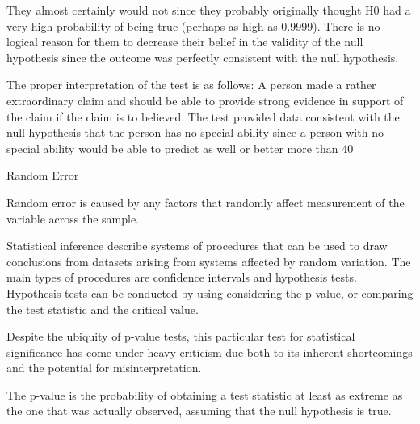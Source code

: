 They almost certainly would not since they probably originally thought H0 had a very high probability of being true (perhaps as high as 0.9999). There is no logical reason for them to decrease their belief in the validity of the null hypothesis since the outcome was perfectly consistent with the null hypothesis. 


The proper interpretation of the test is as follows: A person made a rather extraordinary claim and should be able to provide strong evidence in support of the claim if the claim is to believed. The test provided data consistent with the null hypothesis that the person has no special ability since a person with no special ability would be able to predict as well or better more than 40%


\newpage

Random Error

Random error is caused by any factors that randomly affect measurement of the variable across the sample. 
 
Statistical inference describe systems of procedures that can be used to draw conclusions from datasets arising from systems affected by random variation. The main types of procedures are confidence intervals and hypothesis tests. Hypothesis tests can be conducted by using considering the p-value, or comparing the test statistic and the critical value.
 
Despite the ubiquity of p-value tests, this particular test for statistical significance has come under heavy criticism due both to its inherent shortcomings and the potential for misinterpretation.

The p-value is the probability of obtaining a test statistic at least as extreme as the one that was actually observed,
assuming that the null hypothesis is true.
 
